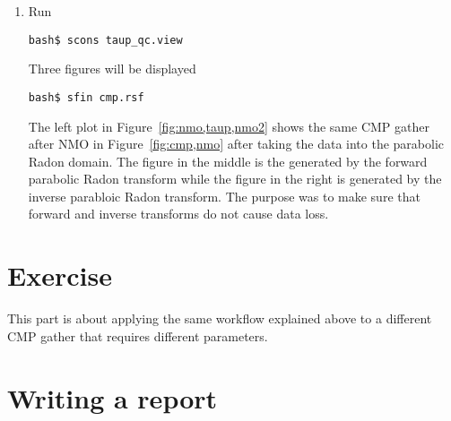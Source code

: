 \begin{enumerate}
\item Run
\begin{verbatim}
bash$ scons taup_qc.view
\end{verbatim}
Three figures will be displayed
\begin{verbatim}
bash$ sfin cmp.rsf
\end{verbatim}


The left plot in Figure~\ref{fig:nmo,taup,nmo2} shows the same CMP gather after NMO in Figure~\ref{fig:cmp,nmo} after taking the data into the parabolic Radon domain. The figure in the middle is the generated by the forward parabolic Radon transform while the figure in the right is generated by the inverse parabloic Radon transform. The purpose was to make sure that forward and inverse transforms do not cause data loss.

\end{enumerate}

\lstset{language=python,numbers=left,numberstyle=\tiny,showstringspaces=false}


\section{Exercise}

This part is about applying the same workflow explained above to a different CMP gather that requires different
parameters.

\section{Writing a report}

